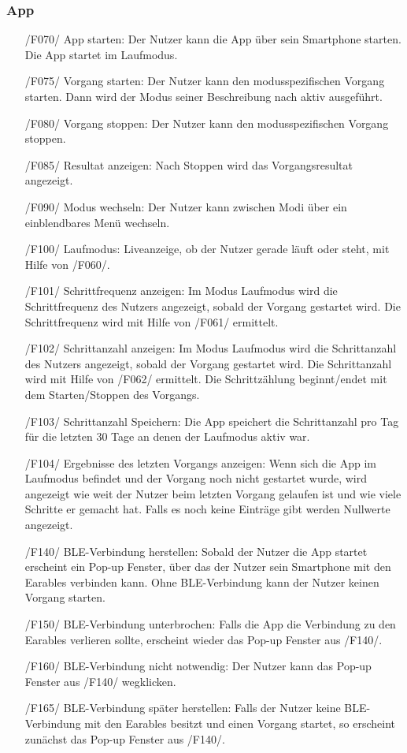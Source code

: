 \documentclass[a4paper,12pt]{article}
\begin{document}
    \subsubsection{App}
      \begin{itemize}
      \item[/F070/] \textsf{App starten:} Der Nutzer kann die App über sein Smartphone starten. Die App startet im Laufmodus.
      \item[/F075/] \textsf{Vorgang starten:} Der Nutzer kann den modusspezifischen \Gls{Vorgang} starten. Dann wird der Modus seiner Beschreibung nach aktiv ausgeführt.
      \item[/F080/] \textsf{Vorgang stoppen:} Der Nutzer kann den modusspezifischen \Gls{Vorgang} stoppen.
      \item[/F085/] \textsf{Resultat anzeigen:} Nach Stoppen wird das Vorgangsresultat angezeigt.
      \item[/F090/] \textsf{Modus wechseln:} Der Nutzer kann zwischen Modi über ein einblendbares Menü wechseln.
      \item[/F100/] \textsf{Laufmodus:} Liveanzeige, ob der Nutzer gerade \glqq läuft\grqq{} oder \glqq steht\grqq{}, mit Hilfe von /F060/.
      \item[/F101/] \textsf {Schrittfrequenz anzeigen:} Im Modus \glqq{}Laufmodus\grqq{} wird die Schrittfrequenz des Nutzers angezeigt, sobald der Vorgang gestartet wird. Die Schrittfrequenz wird mit Hilfe von /F061/ ermittelt.
      \item[/F102/] \textsf {Schrittanzahl anzeigen:} Im Modus \glqq{}Laufmodus\grqq{} wird die Schrittanzahl des Nutzers angezeigt, sobald der Vorgang gestartet wird. Die Schrittanzahl wird mit Hilfe von /F062/ ermittelt. Die Schrittzählung beginnt/endet mit dem Starten/Stoppen des Vorgangs.
      \item[/F103/] \textsf{Schrittanzahl Speichern:} Die App speichert die Schrittanzahl pro Tag für die letzten 30 Tage an denen der Laufmodus aktiv war.
      \item[/F104/] \textsf{Ergebnisse des letzten Vorgangs anzeigen:} Wenn sich die App im Laufmodus befindet und der Vorgang noch nicht gestartet wurde, wird angezeigt wie weit der Nutzer beim letzten Vorgang gelaufen ist und wie viele Schritte er gemacht hat. Falls es noch keine Einträge gibt werden Nullwerte angezeigt.
      \item[/F140/] \textsf{BLE-Verbindung herstellen:} Sobald der Nutzer die App startet erscheint ein Pop-up Fenster, über das der Nutzer sein Smartphone mit den \gls{Earables} verbinden kann. Ohne BLE-Verbindung kann der Nutzer keinen Vorgang starten.
      \item[/F150/] \textsf{BLE-Verbindung unterbrochen:} Falls die App die Verbindung zu den \gls{Earables} verlieren sollte, erscheint wieder das Pop-up Fenster aus /F140/.
      \item[/F160/] \textsf{BLE-Verbindung nicht notwendig:} Der Nutzer kann das Pop-up Fenster aus /F140/ wegklicken.
      \item[/F165/] \textsf{BLE-Verbindung später herstellen:} Falls der Nutzer keine BLE-Verbindung mit den \gls{Earables} besitzt und einen Vorgang startet, so erscheint zunächst das Pop-up Fenster aus /F140/.
    \end{itemize}
\end{document}
